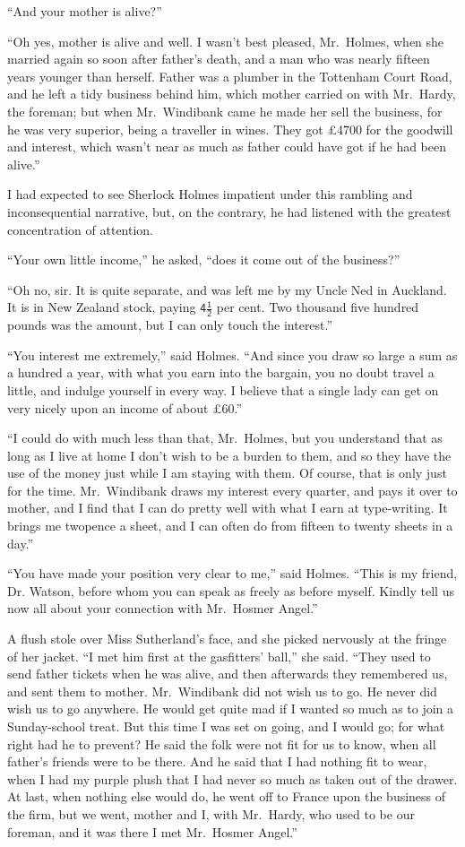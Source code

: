 “And your mother is alive?”

“Oh yes, mother is alive and well. I wasn’t best pleased,
Mr.~Holmes, when she married again so soon after father’s
death, and a man who was nearly fifteen years younger than
herself. Father was a plumber in the Tottenham Court Road,
and he left a tidy business behind him, which mother carried
on with Mr.~Hardy, the foreman; but when Mr.~Windibank
came he made her sell the business, for he was very superior,
being a traveller in wines. They got £4700 for the
goodwill and interest, which wasn’t near as much as father could
have got if he had been alive.”

I had expected to see Sherlock Holmes impatient under this
rambling and inconsequential narrative, but, on the contrary,
he had listened with the greatest concentration of attention.

“Your own little income,” he asked, “does it come out of
the business?”

“Oh no, sir. It is quite separate, and was left me by my
Uncle Ned in Auckland. It is in New Zealand stock, paying
$\mathsf{4\frac{1}{2}}$ per cent. Two thousand five hundred pounds was the
amount, but I can only touch the interest.”

“You interest me extremely,” said Holmes. “And since
you draw so large a sum as a hundred a year, with what you
earn into the bargain, you no doubt travel a little, and indulge
yourself in every way. I believe that a single lady can get on
very nicely upon an income of about £60.”

“I could do with much less than that, Mr.~Holmes, but you
understand that as long as I live at home I don’t wish to be
a burden to them, and so they have the use of the money just
while I am staying with them. Of course, that is only just for
the time. Mr.~Windibank draws my interest every quarter,
and pays it over to mother, and I find that I can do pretty
well with what I earn at type-writing. It brings me twopence
a sheet, and I can often do from fifteen to twenty sheets in a
day.”

“You have made your position very clear to me,” said
Holmes. “This is my friend, Dr. Watson, before whom you
can speak as freely as before myself. Kindly tell us now all
about your connection with Mr.~Hosmer Angel.”

A flush stole over Miss Sutherland’s face, and she picked
nervously at the fringe of her jacket. “I met him first at the
gasfitters’ ball,” she said. “They used to send father tickets
when he was alive, and then afterwards they remembered us,
and sent them to mother. Mr.~Windibank did not wish us to
go. He never did wish us to go anywhere. He would get quite
mad if I wanted so much as to join a Sunday-school treat.
But this time I was set on going, and I would go; for what
right had he to prevent? He said the folk were not fit for us
to know, when all father’s friends were to be there. And he
said that I had nothing fit to wear, when I had my purple
plush that I had never so much as taken out of the drawer.
At last, when nothing else would do, he went off to France
upon the business of the firm, but we went, mother and I, with
Mr.~Hardy, who used to be our foreman, and it was there I
met Mr.~Hosmer Angel.”

